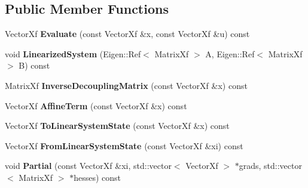 \subsection*{Public Member Functions}
\begin{DoxyCompactItemize}
\item 
Vector\+Xf {\bfseries Evaluate} (const Vector\+Xf \&x, const Vector\+Xf \&u) const \hypertarget{classilqgames_1_1_single_player_flat_unicycle4_d_a8cb7d02af4f2ca075a63c0277cbf1212}{}\label{classilqgames_1_1_single_player_flat_unicycle4_d_a8cb7d02af4f2ca075a63c0277cbf1212}

\item 
void {\bfseries Linearized\+System} (Eigen\+::\+Ref$<$ Matrix\+Xf $>$ A, Eigen\+::\+Ref$<$ Matrix\+Xf $>$ B) const \hypertarget{classilqgames_1_1_single_player_flat_unicycle4_d_a5c6ce1a0c4ed45269091a12d52bbbeab}{}\label{classilqgames_1_1_single_player_flat_unicycle4_d_a5c6ce1a0c4ed45269091a12d52bbbeab}

\item 
Matrix\+Xf {\bfseries Inverse\+Decoupling\+Matrix} (const Vector\+Xf \&x) const \hypertarget{classilqgames_1_1_single_player_flat_unicycle4_d_af5755f84b20abfed167035aa5380b19b}{}\label{classilqgames_1_1_single_player_flat_unicycle4_d_af5755f84b20abfed167035aa5380b19b}

\item 
Vector\+Xf {\bfseries Affine\+Term} (const Vector\+Xf \&x) const \hypertarget{classilqgames_1_1_single_player_flat_unicycle4_d_af7b121d4b464c453c125023f705557cf}{}\label{classilqgames_1_1_single_player_flat_unicycle4_d_af7b121d4b464c453c125023f705557cf}

\item 
Vector\+Xf {\bfseries To\+Linear\+System\+State} (const Vector\+Xf \&x) const \hypertarget{classilqgames_1_1_single_player_flat_unicycle4_d_abde027a03cb3886b23b89afd8dc789ed}{}\label{classilqgames_1_1_single_player_flat_unicycle4_d_abde027a03cb3886b23b89afd8dc789ed}

\item 
Vector\+Xf {\bfseries From\+Linear\+System\+State} (const Vector\+Xf \&xi) const \hypertarget{classilqgames_1_1_single_player_flat_unicycle4_d_ac0e69071e7afb0cbad008e032445abf7}{}\label{classilqgames_1_1_single_player_flat_unicycle4_d_ac0e69071e7afb0cbad008e032445abf7}

\item 
void {\bfseries Partial} (const Vector\+Xf \&xi, std\+::vector$<$ Vector\+Xf $>$ $\ast$grads, std\+::vector$<$ Matrix\+Xf $>$ $\ast$hesses) const \hypertarget{classilqgames_1_1_single_player_flat_unicycle4_d_a78781989d6608ca5004d67bfa14e643c}{}\label{classilqgames_1_1_single_player_flat_unicycle4_d_a78781989d6608ca5004d67bfa14e643c}


\end{DoxyCompactItemize}
